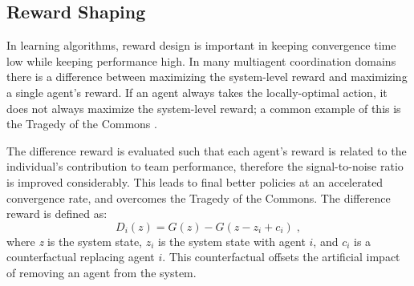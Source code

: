 \documentclass[letterpaper]{article}
\begin{document}




\subsection{Reward Shaping}

In learning algorithms, reward design is important in keeping convergence time low while keeping performance high. In many multiagent coordination domains there is a difference between maximizing the system-level reward and maximizing a single agent's reward. If an agent always takes the locally-optimal action, it does not always maximize the system-level reward; a common example of this is the Tragedy of the Commons \cite{Hardin}.

The difference reward \cite{tumer-wolpert_jair02} is evaluated such that each agent's reward is related to the individual's contribution to team performance, therefore the signal-to-noise ratio is improved considerably. This leads to final better policies at an accelerated convergence rate, and overcomes the Tragedy of the Commons. The difference reward is defined as:
%
\begin{equation}
D_i(z) = G(z) - G(z - z_i + c_i)\;,
\end{equation}
%
where \textit{z} is the system state, $z_i$ is the system state with agent $i$, and $c_i$ is a counterfactual replacing agent $i$. This counterfactual offsets the artificial impact of removing an agent from the system.
\end{document}
